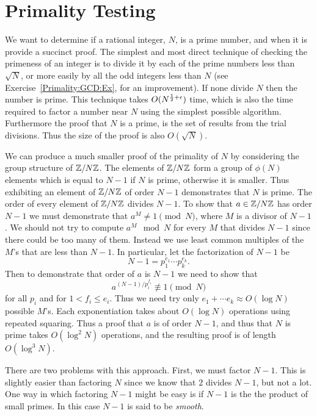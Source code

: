 \chapter{Primality Testing}
\label{Integer:Primality:Chap}

We want to determine if a rational integer, $N$, is a prime number,
and when it is provide a succinct proof.  The simplest and most direct
technique of checking the primeness of an integer is to divide it by
each of the prime numbers less than $\sqrt{N}$, or more easily by all
the odd integers less than $N$ (see Exercise~\ref{Primality:GCD:Ex},
for an improvement).  If none divide $N$ then the number is prime.
This technique takes $O(N^{{1 \over 2} + \epsilon})$ time, which is
also the time required to factor a number near $N$ using the simplest
possible algorithm.  Furthermore the proof that $N$ is a prime, is the
set of results from the trial divisions.  Thus the size of the proof
is also $O(\sqrt{N})$.

We can produce a much smaller proof of the primality of $N$ by considering
the group structure of $\mathbb{Z}/N\mathbb{Z}$.  The elements of $\mathbb{Z}/N\mathbb{Z}$ form a group of
$\phi(N)$ elements which is equal to $N - 1$ if $N$ is prime, otherwise it
is smaller.  Thus exhibiting an element of $\mathbb{Z}/N\mathbb{Z}$ of order $N-1$
demonstrates that $N$ is prime.  The order of every element of $\mathbb{Z}/N\mathbb{Z}$
divides $N-1$.  To show that $a \in \mathbb{Z}/N\mathbb{Z}$ has order $N-1$ we must
demonstrate that $a^{M} \not= 1\pmod{N}$, where $M$ is a divisor of $N-1$.
We should not try to compute $a^{M}\mod{N}$ for every $M$ that divides
$N-1$ since there could be too many of them.  Instead we use least common
multiples of the $M$'s that are less than $N-1$.  In particular, 
let the factorization of  $N-1$ be
\[
N-1 = p_1^{e_1} \cdots p_k^{e_k}.
\]
Then to demonstrate that order of $a$ is $N-1$ we need to show that 
\[
a^{(N -1)/ p_i^{f_i}} \not\equiv 1 \pmod{N}
\]
for all $p_i$ and for $1 < f_i \le e_i$.  Thus we need try only $e_{1}+
\cdots e_{k} \approx O(\log N)$ possible $M$'s.  Each exponentiation takes
about $O(\log N)$ operations using repeated squaring.  Thus a proof that
$a$ is of order $N-1$, and thus that $N$ is prime takes $O(\log^2 N)$
operations, and the resulting proof is of length $O(\log^3 N)$.

There are two problems with this approach.  First, we must factor $N-1$.
This is slightly easier than factoring $N$ since we know that $2$
divides $N-1$, but not a lot.  One way in which factoring $N-1$
might be easy is if $N-1$ is the the product of small primes.  In
this case $N-1$ is said to be {\em smooth\/}.  

